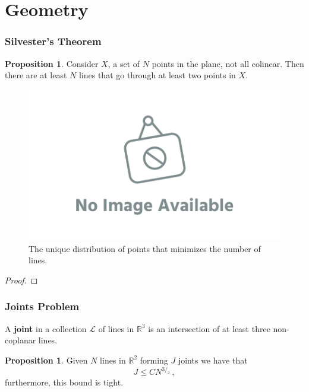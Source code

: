 \documentclass[12pt]{amsart}
\theoremstyle{definition}
\newtheorem{prop}[thm]{Proposition}
\newcommand{\R}{\mathbb{R}}
\begin{document}
\section{Geometry}



\subsubsection*{Silvester's Theorem}

\begin{prop}
Consider $X$, a set of $N$ points in the plane, not all colinear.
Then there are at least $N$ lines that go through at least two points in $X$.
\end{prop}

\begin{figure}[h]
\includegraphics[scale=.1]{../imgs/ina.png}%
\caption{The unique distribution of points that minimizes the number of lines.\label{fig:sylvester}}
\end{figure}

\begin{proof}

\end{proof}

\subsubsection*{Joints Problem}




A \textbf{joint} in a collection $\mathcal L$ of lines in $\R^3$ is an intersection of at least three non-coplanar lines.


\begin{prop}
Given $N$ lines in $\R^2$ forming $J$ joints we have that
$$ J \leq C N^{3/_2}\, ,$$
furthermore, this bound is tight.
\end{prop}
\end{document}
